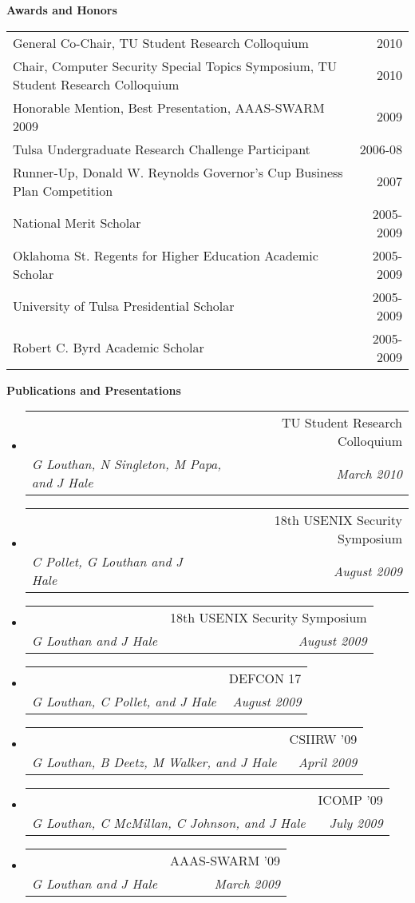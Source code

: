 \documentclass[letterpaper,11pt]{article}
\makeatletter
\newcommand{\resheading}[1]{{\large \colorbox{mygrey}{\begin{minipage}{\textwidth}{\textbf{#1 \vphantom{p\^{E}}}}\end{minipage}}}}
\newcommand{\ressubheading}[4]{
\begin{tabular*}{6.5in}{l@{\extracolsep{\fill}}r}
		\textbf{\parbox{5in}{\raggedright #1 }} & #2 \\
		\textit{#3} & \textit{#4} \\
\end{tabular*}\vspace{-6pt}}
\makeatother
\begin{document}
\resheading{Awards and Honors}
\begin{center}
	\begin{tabular*}{6.5in}{l@{\extracolsep{\fill}}r}
		General Co-Chair, TU Student Research Colloquium & 2010 \\
		Chair, Computer Security Special Topics Symposium, TU Student Research Colloquium & 2010 \\
		Honorable Mention, Best Presentation, AAAS-SWARM 2009 & 2009 \\
		Tulsa Undergraduate Research Challenge Participant & 2006-08\\
		Runner-Up, Donald W. Reynolds Governor's Cup Business Plan Competition & 2007\\
		National Merit Scholar & 2005-2009\\
		Oklahoma St. Regents for Higher Education Academic Scholar & 2005-2009\\
		University of Tulsa Presidential Scholar & 2005-2009\\
		Robert C. Byrd Academic Scholar & 2005-2009\\
	\end{tabular*}
\end{center}

\resheading{Publications and Presentations}
\begin{itemize}
\item
	\ressubheading{\emph{Towards Formal Analysis of Cyber-Physical Systems}}{TU Student Research Colloquium}{G Louthan, N Singleton, M Papa, and J Hale}{March 2010}
\item
	\ressubheading{\emph{Large-scale Multitouch Interactive Network Visualization} (Poster)}{18th USENIX Security Symposium}{C Pollet, G Louthan and J Hale}{August 2009}
\item
	\ressubheading{\emph{SAND: An Architecture for Signature-based Automatic Network Protocol Detection} (Poster)}{18th USENIX Security Symposium}{G Louthan and J Hale}{August 2009}
\item
	\ressubheading{\emph{Hack Like the Movie Stars: A Big-Screen Multitouch Network Monitor}}{DEFCON 17}{G Louthan, C Pollet, and J Hale}{August 2009}
\item
	\ressubheading{\emph{Content-based Alternatives to Conventional Network Monitoring}}{CSIIRW '09}{G Louthan, B Deetz, M Walker, and J Hale}{April 2009}
\item
	\ressubheading{\emph{Toward Robust and Extensible Network Protocol Identification}}{ICOMP '09}{G Louthan, C McMillan, C Johnson, and J Hale}{July 2009}
\item
	\ressubheading{Communication without Boundaries: Breaching the Great Firewall of China}{AAAS-SWARM '09}{G Louthan and J Hale}{March 2009}
\end{itemize}
\end{document}
